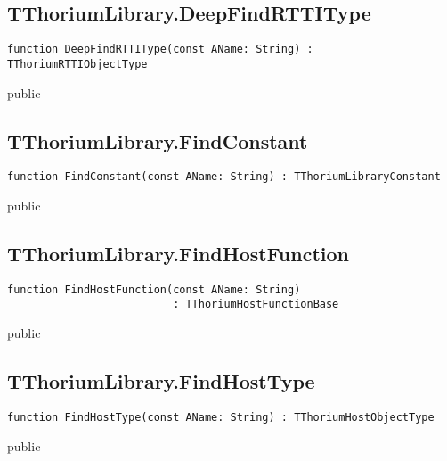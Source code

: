 \subsection{TThoriumLibrary.DeepFindRTTIType}
\label{thoriumcore:thorium:tthoriumlibrary:deepfindrttitype}
\begin{FPCList}
\Synopsis
\Declaration 

\begin{verbatim}
function DeepFindRTTIType(const AName: String) : TThoriumRTTIObjectType
\end{verbatim}
\Visibility
public
\Description
\Errors
\end{FPCList}
\subsection{TThoriumLibrary.FindConstant}
\label{thoriumcore:thorium:tthoriumlibrary:findconstant}
\begin{FPCList}
\Synopsis
\Declaration 

\begin{verbatim}
function FindConstant(const AName: String) : TThoriumLibraryConstant
\end{verbatim}
\Visibility
public
\Description
\Errors
\end{FPCList}
\subsection{TThoriumLibrary.FindHostFunction}
\label{thoriumcore:thorium:tthoriumlibrary:findhostfunction}
\begin{FPCList}
\Synopsis
\Declaration 

\begin{verbatim}
function FindHostFunction(const AName: String)
                          : TThoriumHostFunctionBase
\end{verbatim}
\Visibility
public
\Description
\Errors
\end{FPCList}
\subsection{TThoriumLibrary.FindHostType}
\label{thoriumcore:thorium:tthoriumlibrary:findhosttype}
\begin{FPCList}
\Synopsis
\Declaration 

\begin{verbatim}
function FindHostType(const AName: String) : TThoriumHostObjectType
\end{verbatim}
\Visibility
public
\Description
\Errors
\end{FPCList}
